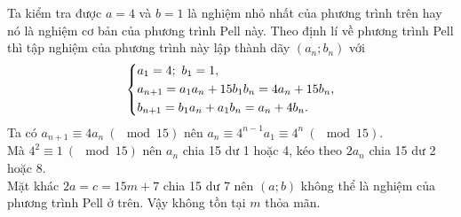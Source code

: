 \begin{ex}
{	Ta kiểm tra được $a=4$ và $b=1$ là nghiệm nhỏ nhất của phương trình trên hay nó là nghiệm cơ bản của phương trình Pell này. Theo định lí về phương trình Pell thì tập nghiệm của phương trình này lập thành dãy $(a_n;b_n)$ với $$\left\{\begin{aligned}&a_1=4;\ b_1=1,\\ &a_{n+1}=a_1a_n+15b_1b_n=4a_n+15b_n,\\ &b_{n+1}=b_1a_n+a_1b_n=a_n+4b_n.\end{aligned}\right.$$
	Ta có $a_{n+1}\equiv 4a_n\ (\mod 15)$ nên $a_n\equiv 4^{n-1}a_1\equiv 4^n\ (\mod 15)$.\\
	Mà $4^2\equiv 1\ (\mod 15)$ nên $a_n$ chia 15 dư 1 hoặc 4, kéo theo $2a_n$ chia 15 dư 2 hoặc 8.\\
	Mặt khác $2a=c=15m+7$ chia 15 dư 7 nên $(a;b)$ không thể là nghiệm của phương trình Pell ở trên. Vậy không tồn tại $m$ thỏa mãn.
}
\end{ex}

